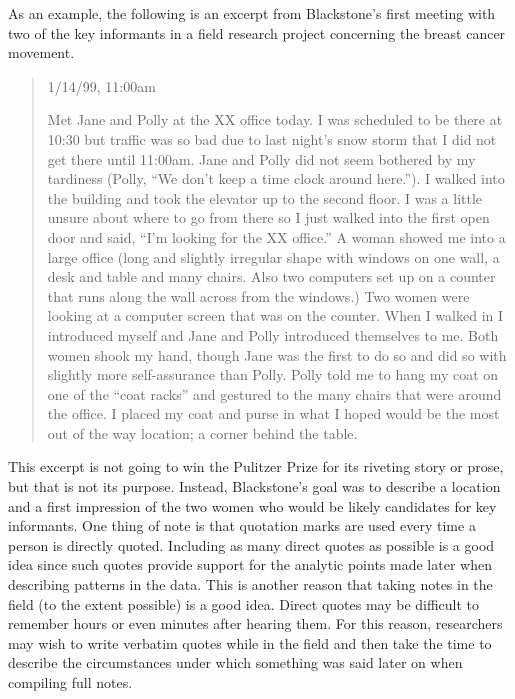 As an example, the following is an excerpt from Blackstone's first meeting with two of the key informants in a field research project concerning the breast cancer movement\cite{blackstone2012principles}.

\begin{quote}
	
1/14/99, 11:00am

Met Jane and Polly at the XX office today. I was scheduled to be there at 10:30 but traffic was so bad due to last night's snow storm that I did not get there until 11:00am. Jane and Polly did not seem bothered by my tardiness (Polly, ``We don't keep a time clock around here.''). I walked into the building and took the elevator up to the second floor. I was a little unsure about where to go from there so I just walked into the first open door and said, ``I'm looking for the XX office.'' A woman showed me into a large office (long and slightly irregular shape with windows on one wall, a desk and table and many chairs. Also two computers set up on a counter that runs along the wall across from the windows.) Two women were looking at a computer screen that was on the counter. When I walked in I introduced myself and Jane and Polly introduced themselves to me. Both women shook my hand, though Jane was the first to do so and did so with slightly more self-assurance than Polly. Polly told me to hang my coat on one of the ``coat racks'' and gestured to the many chairs that were around the office. I placed my coat and purse in what I hoped would be the most out of the way location; a corner behind the table.

\end{quote}

This excerpt is not going to win the Pulitzer Prize for its riveting story or prose, but that is not its purpose. Instead, Blackstone's goal was to describe a location and a first impression of the two women who would be likely candidates for key informants. One thing of note is that quotation marks are used every time a person is directly quoted. Including as many direct quotes as possible is a good idea since such quotes provide support for the analytic points made later when describing patterns in the data. This is another reason that taking notes in the field (to the extent possible) is a good idea. Direct quotes may be difficult to remember hours or even minutes after hearing them. For this reason, researchers may wish to write verbatim quotes while in the field and then take the time to describe the circumstances under which something was said later on when compiling full notes.

